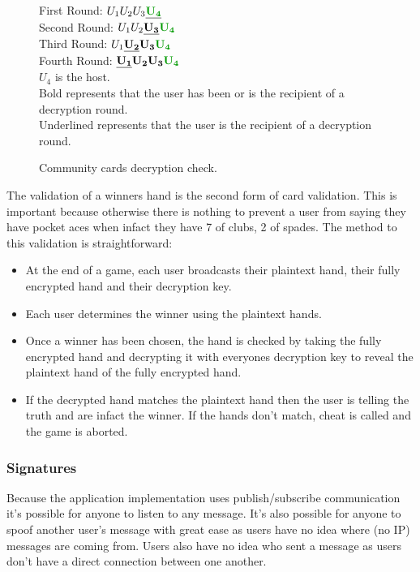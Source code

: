 \documentclass[11pt, oneside]{article}   	%
\begin{document}
\begin{figure}[h]
\caption{Community cards decryption check.}
First Round:		$U_1 U_2 U_3 \underline{{\bf \color{dkgreen}U_4}}$\\
Second Round: 	$U_1 U_2 \underline{\bf U_3} {\bf \color{dkgreen}U_4}$\\
Third Round:		$U_1 \underline{\bf U_2} {\bf U_3} {\bf \color{dkgreen}U_4}$\\
Fourth Round:		$\underline{\bf U_1} {\bf U_2} {\bf U_3} {\bf \color{dkgreen}U_4}$\\

{\bf \color{dkgreen}$U_4$} is the host.\\
Bold represents that the user has been or is the recipient of a decryption round.\\
Underlined represents that the user is the recipient of a decryption round.
\label{fig:com}
\end{figure}

The validation of a winners hand is the second form of card validation. This is important because otherwise there is nothing to prevent a user from saying they have pocket aces when infact they have 7 of clubs, 2 of spades. The method to this validation is straightforward:

\begin{itemize}
\renewcommand{\labelitemi}{$\bullet$}
\item At the end of a game, each user broadcasts their plaintext hand, their fully encrypted hand and their decryption key.
\item Each user determines the winner using the plaintext hands.
\item Once a winner has been chosen, the hand is checked by taking the fully encrypted hand and decrypting it with everyones decryption key to reveal the plaintext hand of the fully encrypted hand.
\item If the decrypted hand matches the plaintext hand then the user is telling the truth and are infact the winner. If the hands don’t match, cheat is called and the game is aborted.
\end{itemize}

\subsubsection{Signatures}

Because the application implementation uses publish/subscribe communication it’s possible for anyone to listen to any message. It’s also possible for anyone to spoof another user's message with great ease as users have no idea where (no IP) messages are coming from. Users also have no idea who sent a message as users don’t have a direct connection between one another.\\
\end{document}
